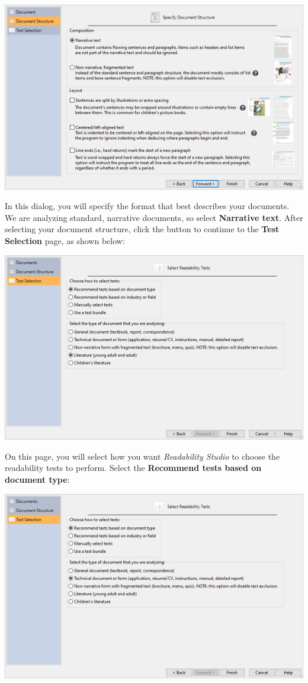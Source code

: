 \documentclass[
]{book}
\theoremstyle{definition}
\theoremstyle{definition}
\theoremstyle{definition}
\theoremstyle{definition}
\theoremstyle{remark}
\begin{document}
\includegraphics{Images/wizarddocstructure.png}

In this dialog, you will specify the format that best describes your documents. We are analyzing standard, narrative documents, so select \textbf{Narrative text}. After selecting your document structure, click the  button to continue to the \textbf{Test Selection} page, as shown below:

\includegraphics{Images/wizardbatchreadabilitymethods.png}

On this page, you will select how you want \emph{Readability Studio} to choose the readability tests to perform. Select the \textbf{Recommend tests based on document type}:

\includegraphics{Images/wizardbatchdoctype.png}
\end{document}
